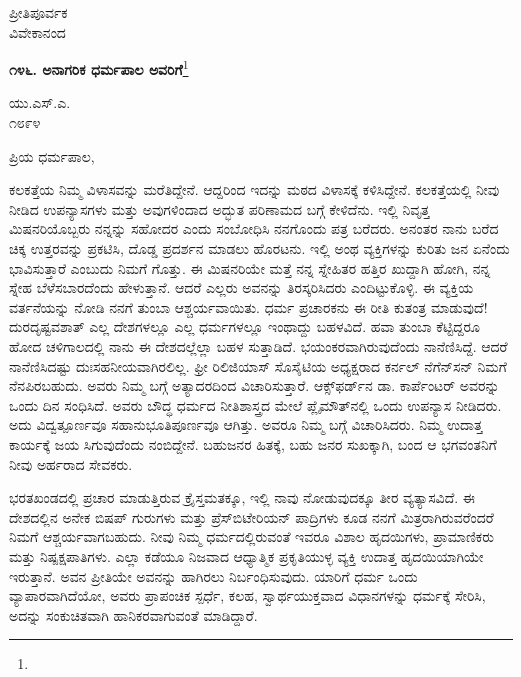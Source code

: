 {\flushright
ಪ್ರೀತಿಪೂರ್ವಕ\\ವಿವೇಕಾನಂದ\par}
\vspace{-0.5cm}

\begin{center}
\textbf{೧೪೬. ಅನಾಗರಿಕ ಧರ್ಮಪಾಲ ಅವರಿಗೆ}\footnote{}
\end{center}

\vspace{-0.8cm}

\begin{flushright}
ಯು.ಎಸ್.ಎ.\\೧೮೯೪
\end{flushright}

\vspace{-0.8cm}

\noindent
ಪ್ರಿಯ ಧರ್ಮಪಾಲ,

ಕಲಕತ್ತೆಯ ನಿಮ್ಮ ವಿಳಾಸವನ್ನು ಮರೆತಿದ್ದೇನೆ. ಆದ್ದರಿಂದ ಇದನ್ನು ಮಠದ ವಿಳಾಸಕ್ಕೆ ಕಳಿಸಿದ್ದೇನೆ. ಕಲಕತ್ತೆಯಲ್ಲಿ ನೀವು ನೀಡಿದ ಉಪನ್ಯಾಸಗಳು ಮತ್ತು ಅವುಗಳಿಂದಾದ ಅದ್ಭುತ ಪರಿಣಾಮದ ಬಗ್ಗೆ ಕೇಳಿದೆನು. ಇಲ್ಲಿ ನಿವೃತ್ತ ಮಿಷನರಿಯೊಬ್ಬರು ನನ್ನನ್ನು ಸಹೋದರ ಎಂದು ಸಂಬೋಧಿಸಿ ನನಗೊಂದು ಪತ್ರ ಬರೆದರು. ಅನಂತರ ನಾನು ಬರೆದ ಚಿಕ್ಕ ಉತ್ತರವನ್ನು ಪ್ರಕಟಿಸಿ, ದೊಡ್ಡ ಪ್ರದರ್ಶನ ಮಾಡಲು ಹೊರಟನು. ಇಲ್ಲಿ ಅಂಥ ವ್ಯಕ್ತಿಗಳನ್ನು ಕುರಿತು ಜನ ಏನೆಂದು ಭಾವಿಸುತ್ತಾರೆ ಎಂಬುದು ನಿಮಗೆ ಗೊತ್ತು. ಈ ಮಿಷನರಿಯೇ ಮತ್ತೆ ನನ್ನ ಸ್ನೇಹಿತರ ಹತ್ತಿರ ಖುದ್ದಾಗಿ ಹೋಗಿ, ನನ್ನ ಸ್ನೇಹ ಬೆಳೆಸಬಾರದೆಂದು ಹೇಳುತ್ತಾನೆ. ಆದರೆ ಎಲ್ಲರು ಅವನನ್ನು ತಿರಸ್ಕರಿಸಿದರು ಎಂದಿಟ್ಟುಕೊಳ್ಳಿ. ಈ ವ್ಯಕ್ತಿಯ ವರ್ತನೆಯನ್ನು ನೋಡಿ ನನಗೆ ತುಂಬಾ ಆಶ್ಚರ್ಯವಾಯಿತು. ಧರ್ಮ ಪ್ರಚಾರಕನು ಈ ರೀತಿ ಕುತಂತ್ರ ಮಾಡುವುದೆ!ದುರದೃಷ್ಟವಶಾತ್ ಎಲ್ಲ ದೇಶಗಳಲ್ಲೂ ಎಲ್ಲ ಧರ್ಮಗಳಲ್ಲೂ ಇಂಥಾದ್ದು ಬಹಳವಿದೆ. ಹವಾ ತುಂಬಾ ಕೆಟ್ಟಿದ್ದರೂ ಹೋದ ಚಳಿಗಾಲದಲ್ಲಿ ನಾನು ಈ ದೇಶದಲ್ಲೆಲ್ಲಾ ಬಹಳ ಸುತ್ತಾಡಿದೆ. ಭಯಂಕರವಾಗಿರುವುದೆಂದು ನಾನೆಣಿಸಿದ್ದೆ. ಆದರೆ ನಾನೆಣಿಸಿದಷ್ಟು ದುಃಸಹನೀಯವಾಗಿರಲಿಲ್ಲ. ಫ್ರೀ ರಿಲಿಜಿಯಾಸ್ ಸೊಸೈಟಿಯ ಅಧ್ಯಕ್ಷರಾದ ಕರ್ನಲ್ ನೆಗೆನ್‌ಸನ್ ನಿಮಗೆ ನೆನಪಿರಬಹುದು. ಅವರು ನಿಮ್ಮ ಬಗ್ಗೆ ಅತ್ಯಾದರದಿಂದ ವಿಚಾರಿಸುತ್ತಾರೆ. ಆಕ್ಸ್‌ಫರ್ಡ್‌ನ ಡಾ. ಕಾರ್ಪೆಂಟರ್ ಅವರನ್ನು ಒಂದು ದಿನ ಸಂಧಿಸಿದೆ. ಅವರು ಬೌದ್ಧ ಧರ್ಮದ ನೀತಿಶಾಸ್ತ್ರದ ಮೇಲೆ ಪ್ಲೈಮೌತ್‌ನಲ್ಲಿ ಒಂದು ಉಪನ್ಯಾಸ ನೀಡಿದರು. ಅದು ವಿದ್ವತ್ಪೂರ್ಣವೂ ಸಹಾನುಭೂತಿಪೂರ್ಣವೂ ಆಗಿತ್ತು. ಅವರೂ ನಿಮ್ಮ ಬಗ್ಗೆ ವಿಚಾರಿಸಿದರು. ನಿಮ್ಮ ಉದಾತ್ತ ಕಾರ್ಯಕ್ಕೆ ಜಯ ಸಿಗುವುದೆಂದು ನಂಬಿದ್ದೇನೆ. ಬಹುಜನರ ಹಿತಕ್ಕೆ, ಬಹು ಜನರ ಸುಖಕ್ಕಾಗಿ, ಬಂದ ಆ ಭಗವಂತನಿಗೆ ನೀವು ಅರ್ಹರಾದ ಸೇವಕರು.

ಭರತಖಂಡದಲ್ಲಿ ಪ್ರಚಾರ ಮಾಡುತ್ತಿರುವ ಕ್ರೈಸ್ತಮತಕ್ಕೂ, ಇಲ್ಲಿ ನಾವು ನೋಡುವುದಕ್ಕೂ ತೀರ ವ್ಯತ್ಯಾಸವಿದೆ. ಈ ದೇಶದಲ್ಲಿನ ಅನೇಕ ಬಿಷಪ್ ಗುರುಗಳು ಮತ್ತು ಪ್ರೆಸ್‌ಬಿಟೇರಿಯನ್ ಪಾದ್ರಿಗಳು ಕೂಡ ನನಗೆ ಮಿತ್ರರಾಗಿರುವರೆಂದರೆ ನಿಮಗೆ ಆಶ್ಚರ್ಯವಾಗಬಹುದು. ನೀವು ನಿಮ್ಮ ಧರ್ಮದಲ್ಲಿರುವಂತೆ ಇವರೂ ವಿಶಾಲ ಹೃದಯಿಗಳು, ಪ್ರಾಮಾಣಿಕರು ಮತ್ತು ನಿಷ್ಪಕ್ಷಪಾತಿಗಳು. ಎಲ್ಲಾ ಕಡೆಯೂ ನಿಜವಾದ ಆಧ್ಯಾತ್ಮಿಕ ಪ್ರಕೃತಿಯುಳ್ಳ ವ್ಯಕ್ತಿ ಉದಾತ್ತ ಹೃದಯಿಯಾಗಿಯೇ ಇರುತ್ತಾನೆ. ಅವನ ಪ್ರೀತಿಯೇ ಅವನನ್ನು ಹಾಗಿರಲು ನಿರ್ಬಂಧಿಸುವುದು. ಯಾರಿಗೆ ಧರ್ಮ ಒಂದು ವ್ಯಾಪಾರವಾಗಿದೆಯೋ, ಅವರು ಪ್ರಾಪಂಚಿಕ ಸ್ಪರ್ಧೆ, ಕಲಹ, ಸ್ವಾರ್ಥಯುಕ್ತವಾದ ವಿಧಾನಗಳನ್ನು ಧರ್ಮಕ್ಕೆ ಸೇರಿಸಿ, ಅದನ್ನು ಸಂಕುಚಿತವಾಗಿ ಹಾನಿಕರವಾಗುವಂತೆ ಮಾಡಿದ್ದಾರೆ.

